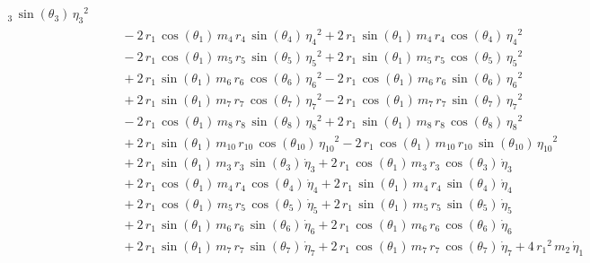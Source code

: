 \begin{eqnarray*}
_{3}\,\sin({\theta_{3}})\,{{\eta_{3}}}^2 \\ &&\quad\mbox{} - 2\,r_{1}
\,\cos({\theta_{1}})\,m_{4}\,r_{4}\,\sin({\theta_{4}})\,{{\eta_{4}}}^2
 + 2\,r_{1}\,\sin({\theta_{1}})\,m_{4}\,r_{4}\,\cos({\theta_{4}})\,{{
\eta_{4}}}^2 \\ &&\quad\mbox{} - 2\,r_{1}\,\cos({\theta_{1}})\,m_{5}\,
r_{5}\,\sin({\theta_{5}})\,{{\eta_{5}}}^2 + 2\,r_{1}\,\sin({\theta_{1}
})\,m_{5}\,r_{5}\,\cos({\theta_{5}})\,{{\eta_{5}}}^2 \\ &&\quad\mbox{}
 + 2\,r_{1}\,\sin({\theta_{1}})\,m_{6}\,r_{6}\,\cos({\theta_{6}})\,{{
\eta_{6}}}^2 - 2\,r_{1}\,\cos({\theta_{1}})\,m_{6}\,r_{6}\,\sin({
\theta_{6}})\,{{\eta_{6}}}^2 \\ &&\quad\mbox{} + 2\,r_{1}\,\sin({
\theta_{1}})\,m_{7}\,r_{7}\,\cos({\theta_{7}})\,{{\eta_{7}}}^2 - 2\,r
_{1}\,\cos({\theta_{1}})\,m_{7}\,r_{7}\,\sin({\theta_{7}})\,{{\eta_{7}
}}^2 \\ &&\quad\mbox{} - 2\,r_{1}\,\cos({\theta_{1}})\,m_{8}\,r_{8}\,
\sin({\theta_{8}})\,{{\eta_{8}}}^2 + 2\,r_{1}\,\sin({\theta_{1}})\,m_{
8}\,r_{8}\,\cos({\theta_{8}})\,{{\eta_{8}}}^2 \\ &&\quad\mbox{} + 2\,r
_{1}\,\sin({\theta_{1}})\,m_{10}\,r_{10}\,\cos({\theta_{10}})\,{{\eta
_{10}}}^2 - 2\,r_{1}\,\cos({\theta_{1}})\,m_{10}\,r_{10}\,\sin({\theta
_{10}})\,{{\eta_{10}}}^2 \\ &&\quad\mbox{} + 2\,r_{1}\,\sin({\theta_{1
}})\,m_{3}\,r_{3}\,\sin({\theta_{3}})\,{\dot{\eta}_{3}} + 2\,r_{1}\,
\cos({\theta_{1}})\,m_{3}\,r_{3}\,\cos({\theta_{3}})\,{\dot{\eta}_{3}}
 \\ &&\quad\mbox{} + 2\,r_{1}\,\cos({\theta_{1}})\,m_{4}\,r_{4}\,\cos(
{\theta_{4}})\,{\dot{\eta}_{4}} + 2\,r_{1}\,\sin({\theta_{1}})\,m_{4}
\,r_{4}\,\sin({\theta_{4}})\,{\dot{\eta}_{4}} \\ &&\quad\mbox{} + 2\,r
_{1}\,\cos({\theta_{1}})\,m_{5}\,r_{5}\,\cos({\theta_{5}})\,{
\dot{\eta}_{5}} + 2\,r_{1}\,\sin({\theta_{1}})\,m_{5}\,r_{5}\,\sin({
\theta_{5}})\,{\dot{\eta}_{5}} \\ &&\quad\mbox{} + 2\,r_{1}\,\sin({
\theta_{1}})\,m_{6}\,r_{6}\,\sin({\theta_{6}})\,{\dot{\eta}_{6}} + 2\,
r_{1}\,\cos({\theta_{1}})\,m_{6}\,r_{6}\,\cos({\theta_{6}})\,{
\dot{\eta}_{6}} \\ &&\quad\mbox{} + 2\,r_{1}\,\sin({\theta_{1}})\,m_{7
}\,r_{7}\,\sin({\theta_{7}})\,{\dot{\eta}_{7}} + 2\,r_{1}\,\cos({
\theta_{1}})\,m_{7}\,r_{7}\,\cos({\theta_{7}})\,{\dot{\eta}_{7}} + 4\,
{r_{1}}^2\,m_{2}\,{\dot{\eta}_{1}} \end{eqnarray*}
